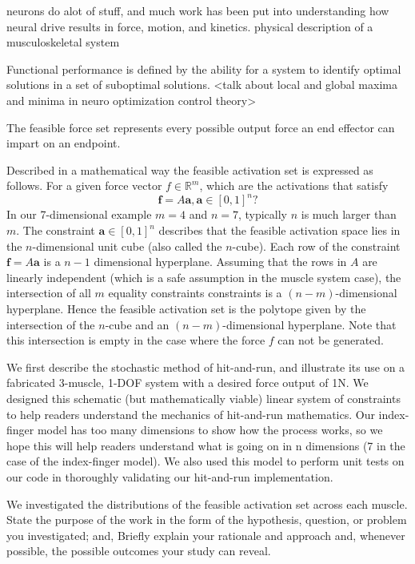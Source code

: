neurons do alot of stuff, and much work has been put into understanding how neural drive results in force, motion, and kinetics. 
physical description of a musculoskeletal system


Functional performance is defined by the ability for a system to identify optimal solutions in a set of suboptimal solutions. 
<talk about local and global maxima and minima in neuro optimization control theory>

The feasible force set represents every possible output force an end effector can impart on an endpoint.






Described in a mathematical way the feasible activation set is expressed as follows. For a given force vector $f \in \mathbb{R}^m$, which are the activations that satisfy
\[\textbf{f} = A\textbf{a}, \textbf{a} \in [0,1]^n?\]
In our 7-dimensional example $m =4$ and $n =7$, typically $n$ is much larger than $m$.
The constraint $\textbf{a} \in [0,1]^n$ describes that the feasible activation space lies in the $n$-dimensional unit cube (also called the $n$-cube). Each row of the constraint $\textbf{f} = A\textbf{a}$ is a $n-1$ dimensional hyperplane. Assuming that the rows in $A$ are linearly independent (which is a safe assumption in the muscle system case), the intersection of all $m$ equality constraints constraints is a $(n-m)$-dimensional hyperplane. Hence the feasible activation set is the polytope given by the intersection of the $n$-cube and an $(n-m)$-dimensional hyperplane. Note that this intersection is empty in the case where the force $f$ can not be generated.



We first describe the stochastic method of hit-and-run, and illustrate its use on a fabricated 3-muscle, 1-DOF system with a desired force output of 1N. We designed this schematic (but mathematically viable) linear system of constraints to help readers understand the mechanics of hit-and-run mathematics. Our index-finger model has too many dimensions to show how the process works, so we hope this will help readers understand what is going on in n dimensions (7 in the case of the index-finger model). We also used this model to perform unit tests on our code in thoroughly validating our hit-and-run implementation.

We investigated the distributions of the feasible activation set across each muscle.
State the purpose of the work in the form of the hypothesis, question, or problem you investigated; and,
Briefly explain your rationale and approach and, whenever possible, the possible outcomes your study can reveal.
